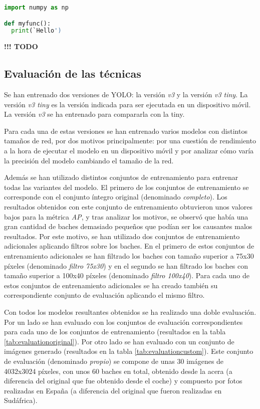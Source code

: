 \begin{lstlisting}[frame=single, basicstyle=\ttfamily\footnotesize, language=Python, caption={bla bla bla...}, captionpos=b]
import numpy as np

def myfunc():
  print(`Hello')
\end{lstlisting}

{\color{red} \textbf{!!! TODO}}

\subsection{Evaluación de las técnicas}

Se han entrenado dos versiones de YOLO: la versión \textit{v3} y la versión \textit{v3 tiny}. La versión \textit{v3 tiny} es la versión indicada para ser ejecutada en un dispositivo móvil. La versión \textit{v3} se ha entrenado para compararla con la tiny.

Para cada una de estas versiones se han entrenado varios modelos con distintos tamaños de red, por dos motivos principalmente: por una cuestión de rendimiento a la hora de ejecutar el modelo en un dispositivo móvil y por analizar cómo varía la precisión del modelo cambiando el tamaño de la red.

Además se han utilizado distintos conjuntos de entrenamiento para entrenar todas las variantes del modelo. El primero de los conjuntos de entrenamiento se corresponde con el conjunto íntegro original (denominado \textit{completo}). Los resultados obtenidos con este conjunto de entrenamiento obtuvieron unos valores bajos para la métrica \textit{AP}, y tras analizar los motivos, se observó que había una gran cantidad de baches demasiado pequeños que podían ser los causantes malos resultados. Por este motivo, se han utilizado dos conjuntos de entrenamiento adicionales aplicando filtros sobre los baches. En el primero de estos conjuntos de entrenamiento adicionales se han filtrado los baches con tamaño superior a 75x30 píxeles (denominado \textit{filtro 75x30}) y en el segundo se han filtrado los baches con tamaño superior a 100x40 píxeles (denominado \textit{filtro 100x40}). Para cada uno de estos conjuntos de entrenamiento adicionales se ha creado también su correspondiente conjunto de evaluación aplicando el mismo filtro.

Con todos los modelos resultantes obtenidos se ha realizado una doble evaluación. Por un lado se han evaluado con los conjuntos de evaluación correspondientes para cada uno de los conjuntos de entrenamiento (resultados en la tabla \ref{tab:evaluationoriginal}). Por otro lado se han evaluado con un conjunto de imágenes generado (resultados en la tabla \ref{tab:evaluationcustom}). Este conjunto de evaluación (denominado \textit{propio}) se compone de unas 30 imágenes de 4032x3024 píxeles, con unos 60 baches en total, obtenido desde la acera (a diferencia del original que fue obtenido desde el coche) y compuesto por fotos realizadas en España (a diferencia del original que fueron realizadas en Sudáfrica).

